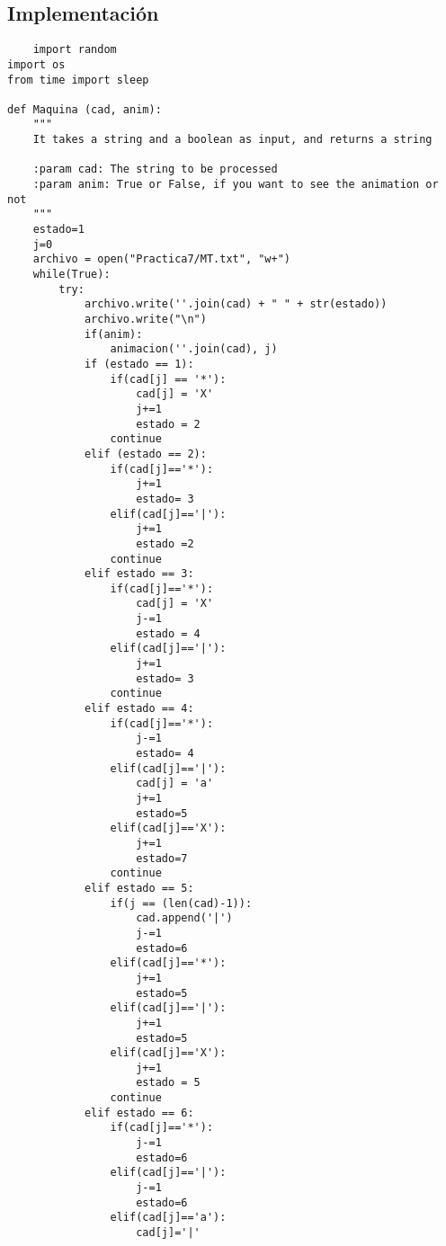\documentclass{article}
\begin{document}
\subsection{Implementaci\'on}
\begin{lstlisting}
    import random
import os
from time import sleep

def Maquina (cad, anim):
    """
    It takes a string and a boolean as input, and returns a string
    
    :param cad: The string to be processed
    :param anim: True or False, if you want to see the animation or not
    """
    estado=1
    j=0
    archivo = open("Practica7/MT.txt", "w+")
    while(True):
        try:
            archivo.write(''.join(cad) + " " + str(estado))
            archivo.write("\n")
            if(anim):
                animacion(''.join(cad), j)
            if (estado == 1):
                if(cad[j] == '*'):
                    cad[j] = 'X'
                    j+=1
                    estado = 2
                continue
            elif (estado == 2):
                if(cad[j]=='*'):
                    j+=1
                    estado= 3
                elif(cad[j]=='|'):
                    j+=1
                    estado =2
                continue
            elif estado == 3:
                if(cad[j]=='*'):
                    cad[j] = 'X'
                    j-=1
                    estado = 4
                elif(cad[j]=='|'):
                    j+=1
                    estado= 3
                continue
            elif estado == 4:
                if(cad[j]=='*'):
                    j-=1
                    estado= 4
                elif(cad[j]=='|'):
                    cad[j] = 'a'
                    j+=1
                    estado=5
                elif(cad[j]=='X'):
                    j+=1
                    estado=7
                continue
            elif estado == 5:
                if(j == (len(cad)-1)):
                    cad.append('|')
                    j-=1
                    estado=6
                elif(cad[j]=='*'):
                    j+=1
                    estado=5
                elif(cad[j]=='|'):
                    j+=1
                    estado=5
                elif(cad[j]=='X'):
                    j+=1
                    estado = 5
                continue
            elif estado == 6:
                if(cad[j]=='*'):
                    j-=1
                    estado=6
                elif(cad[j]=='|'):
                    j-=1
                    estado=6
                elif(cad[j]=='a'):
                    cad[j]='|'

\end{lstlisting}
\end{document}
